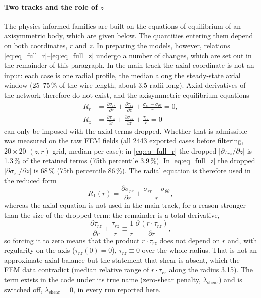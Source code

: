 \documentclass[pdflatex,sn-basic,Numbered]{sn-jnl}
\begin{document}
\paragraph{Two tracks and the role of $z$}
The physics-informed families are built on the equations of equilibrium of an
axisymmetric body, which are given below. The quantities entering them depend
on both coordinates, $r$ and $z$. In preparing the models, however, relations
\eqref{eq:eq_full_r}--\eqref{eq:eq_full_z} undergo a number of changes, which
are set out in the remainder of this paragraph.
In the main track the axial coordinate is not an input: each case is one radial
profile, the median along the steady-state axial window (25--75\,\% of the wire
length, about 3.5 radii long).
Axial derivatives of the network therefore do not exist, and the axisymmetric
equilibrium equations
\begin{align}
  R_r &= \frac{\partial\sigma_{rr}}{\partial r}
        + \frac{\partial\tau_{rz}}{\partial z}
        + \frac{\sigma_{rr}-\sigma_{\theta\theta}}{r} = 0, \label{eq:eq_full_r}\\
  R_z &= \frac{\partial\tau_{rz}}{\partial r}
        + \frac{\partial\sigma_{zz}}{\partial z}
        + \frac{\tau_{rz}}{r} = 0 \label{eq:eq_full_z}
\end{align}
can only be imposed with the axial terms dropped. Whether that is admissible was
measured on the raw FEM fields (all 2443 exported cases before filtering, $20\times20$ $(z,r)$ grid, median per
case): in \eqref{eq:eq_full_r} the dropped $|\partial\tau_{rz}/\partial z|$ is
1.3\,\% of the retained terms (75th percentile 3.9\,\%). In \eqref{eq:eq_full_z}
the dropped $|\partial\sigma_{zz}/\partial z|$ is 68\,\% (75th percentile 86\,\%).
The radial equation is therefore used in the reduced form
\begin{equation}
  R_1(r) = \frac{\partial\sigma_{rr}}{\partial r}
         + \frac{\sigma_{rr}-\sigma_{\theta\theta}}{r},
  \label{eq:eq_red}
\end{equation}
whereas the axial equation is not used in the main track, for a reason stronger
than the size of the dropped term: the remainder is a total derivative,
\begin{equation}
  \frac{\partial\tau_{rz}}{\partial r} + \frac{\tau_{rz}}{r}
  \equiv \frac{1}{r}\,\frac{\partial\,(r\cdot\tau_{rz})}{\partial r},
  \label{eq:identity}
\end{equation}
so forcing it to zero means that the product $r\cdot\tau_{rz}$ does not depend on $r$ and, with regularity on
the axis ($\tau_{rz}(0)=0$), $\tau_{rz}\equiv0$ over the whole radius. That is not
an approximate axial balance but the statement that shear is absent, which the
FEM data contradict (median relative range of $r\cdot\tau_{rz}$ along the radius
3.15).
The term exists in the code under its true name (zero-shear penalty,
$\lambda_{\mathrm{shear}}$) and is switched off, $\lambda_{\mathrm{shear}}=0$, in
every run reported here.
\end{document}
